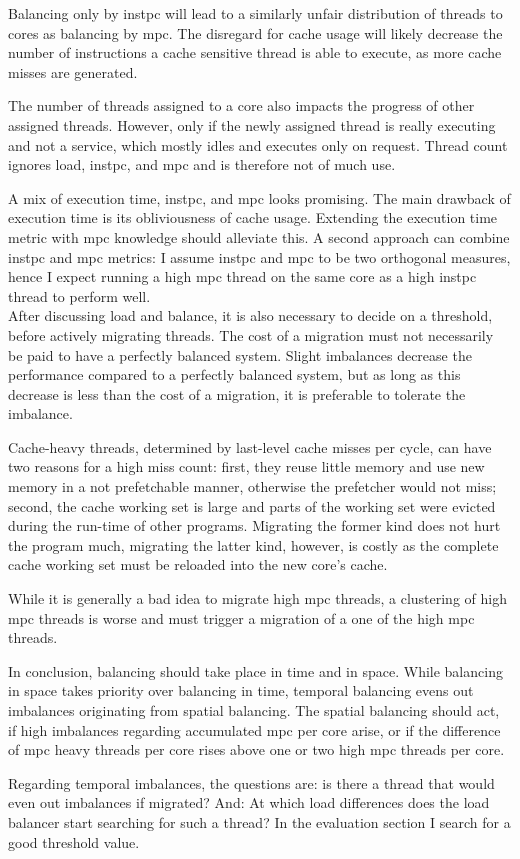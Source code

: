 Balancing only by \gls{instpc} will lead to a similarly unfair distribution of
threads to cores as balancing by \gls{mpc}.
The disregard for cache usage will likely decrease the number of instructions
a cache sensitive thread is able to execute, as more cache misses are
generated.

The number of threads assigned to a core also impacts the progress of other
assigned threads.
However, only if the newly assigned thread is really executing and not a service,
which mostly idles and executes only on request.
Thread count ignores load, \gls{instpc}, and \gls{mpc} and is therefore
not of much use.

A mix of execution time, \gls{instpc}, and \gls{mpc} looks promising.
The main drawback of execution time is its obliviousness of cache usage.
Extending the execution time metric with \gls{mpc} knowledge should alleviate this.
A second approach can combine \gls{instpc} and \gls{mpc} metrics: I assume
\gls{instpc} and \gls{mpc} to be two orthogonal measures, hence I expect running a
high \gls{mpc} thread on the same core as a high \gls{instpc} thread to perform
well.
\\


After discussing load and balance, it is also necessary to decide on a
threshold, before actively migrating threads.
The cost of a migration must not necessarily be paid to have a perfectly
balanced system.
Slight imbalances decrease the performance compared to a perfectly balanced
system, but as long as this decrease is less than the cost of a migration,
it is preferable to tolerate the imbalance.

Cache-heavy threads, determined by last-level cache misses per cycle, can have
two reasons for a high miss count: first, they reuse little memory and use new
memory in a not prefetchable manner, otherwise the prefetcher would not miss;
second, the cache working set is large and parts of the working set were
evicted during the run-time of other programs.
Migrating the former kind does not hurt the program much, migrating the latter
kind, however, is costly as the complete cache working set must be reloaded
into the new core's cache.

While it is generally a bad idea to migrate high \gls{mpc} threads, a
clustering of high \gls{mpc} threads is worse and must trigger a migration of a
one of the high \gls{mpc} threads.

In conclusion, balancing should take place in time and in space.
While balancing in space takes priority over balancing in time, temporal
balancing evens out imbalances originating from spatial balancing.
The spatial balancing should act, if high imbalances regarding accumulated
\gls{mpc} per core arise, or if the difference of \gls{mpc} heavy threads per
core rises above one or two high \gls{mpc} threads per core.

Regarding temporal imbalances, the questions are: is there a thread that would
even out imbalances if migrated?
And: At which load differences does the load balancer start searching for such
a thread?
In the evaluation section I search for a good threshold value.
